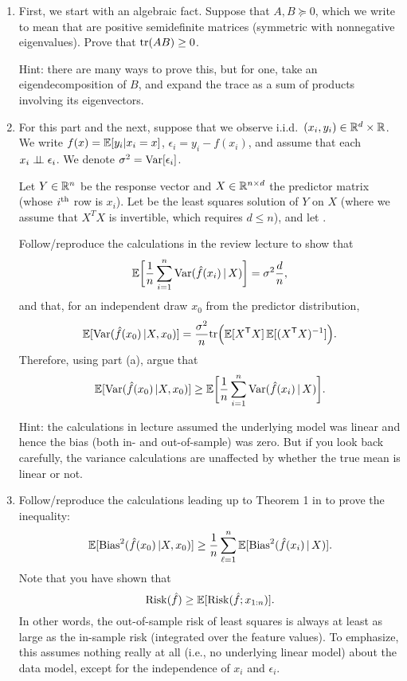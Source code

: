 \documentclass{article}
\begin{document}
\begin{enumerate}[label=(\alph*)]
\item First, we start with an algebraic fact. Suppose that $A,B \succeq 0$, 
  which we write to mean that are positive semidefinite matrices (symmetric with
  nonnegative eigenvalues). Prove that $\mathrm{tr}(AB) \geq 0$. 
  \marginpar{\small [2 pts]} 

  Hint: there are many ways to prove this, but for one, take an
  eigendecomposition of $B$, and expand the trace as a sum of products involving
  its eigenvectors. 

\item For this part and the next, suppose that we observe i.i.d.\ $(x_i,y_i) \in
  \mathbb{R}^d \times \mathbb{R}$. We write $f(x) = \mathbb{E}[y_i|x_i = x]$, $\epsilon_i = y_i -
  f(x_i)$, and assume that each $x_i \perp\!\!\!\perp \epsilon_i$. We denote $\sigma^2 = 
  \mathrm{Var}[\epsilon_i]$. 

  Let $Y \in \mathbb{R}^n$ be the response vector and $X \in \mathbb{R}^{n \times d}$ the
  predictor matrix (whose $i^{\text{th}}$ row is $x_i$). Let  be the least squares solution of $Y$ on $X$ (where we 
  assume that $X^T X$ is invertible, which requires $d \leq n$), and let 
  .  

  Follow/reproduce the calculations in the review lecture to show that
  \marginpar{\small [3 pts]} 
  \[
  \mathbb{E}\bigg[\frac{1}{n} \sum_{i=1}^n \mathrm{Var}(\hat{f}(x_i) \,|\, X) \bigg]= \sigma^2 
  \frac{d}{n}, 
  \]
  and that, for an independent draw $x_0$ from the predictor distribution,
  \marginpar{\small [3 pts]} 
  \[
  \mathbb{E}[\mathrm{Var}(\hat{f}(x_0) \, | X, x_0)] = \frac{\sigma^2}{n} \mathrm{tr}\Big(\mathbb{E} [X^{\mathsf{T}} X] \, \mathbb{E}
  [(X^{\mathsf{T}} X)^{-1}] \Big). 
  \]
  Therefore, using part (a), argue that
  \marginpar{\small [1 pt]}
  \[
  \mathbb{E}[\mathrm{Var}(\hat{f}(x_0) \, | X, x_0)] \geq \mathbb{E}\bigg[\frac{1}{n} \sum_{i=1}^n
  \mathrm{Var}(\hat{f}(x_i) \,|\, X) \bigg]. 
  \]

  Hint: the calculations in lecture assumed the underlying model was linear and
  hence the bias (both in- and out-of-sample) was zero. But if you look back 
  carefully, the variance calculations are unaffected by whether the true mean
  is linear or not.    

\item Follow/reproduce the calculations leading up to Theorem 1 in
  \citet{rosset2020from} to prove the inequality: 
  \marginpar{\small [6 pts]} 
  \[
  \mathbb{E}[\mathrm{Bias}^2(\hat{f}(x_0) \, | X, x_0)] \geq  \frac{1}{n} \sum_{\ell=1}^n 
  \mathbb{E}[\mathrm{Bias}^2(\hat{f}(x_i) \,|\, X)].
  \]
  Note that you have shown that
  \[
  \mathrm{Risk}(\hat{f}) \geq \mathbb{E}[\mathrm{Risk}(\hat{f}; x_{1:n})].
  \]
  In other words, the out-of-sample risk of least squares is always at least as 
  large as the in-sample risk (integrated over the feature values). To
  emphasize, this assumes nothing really at all (i.e., no underlying linear
  model) about the data model, except for the independence of $x_i$ and
  $\epsilon_i$.   


\end{enumerate}
\end{document}
